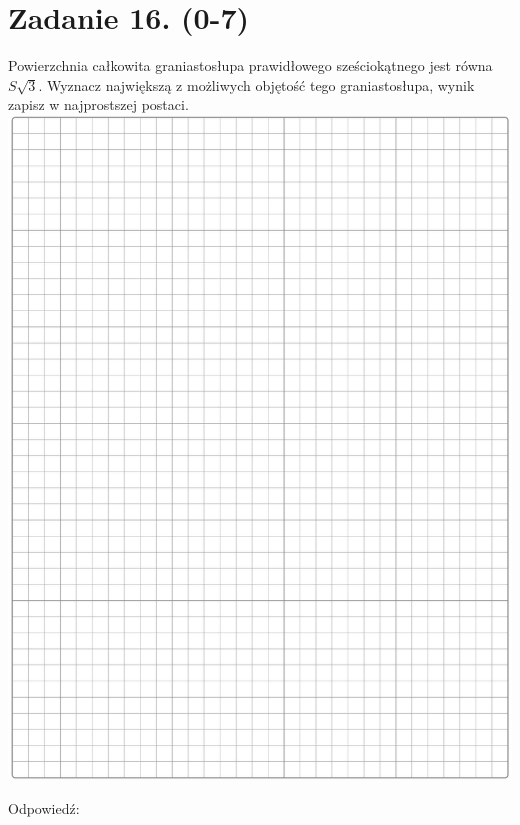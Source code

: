 \documentclass[10pt]{article}
\begin{document}
\section*{Zadanie 16. (0-7)}
Powierzchnia całkowita graniastosłupa prawidłowego sześciokątnego jest równa \(S \sqrt{3}\). Wyznacz największą z możliwych objętość tego graniastosłupa, wynik zapisz w najprostszej postaci.\\
\includegraphics[max width=\textwidth, center]{2024_11_21_d15133c79177ee6989d3g-11}

Odpowiedź: \(\qquad\)
\end{document}
